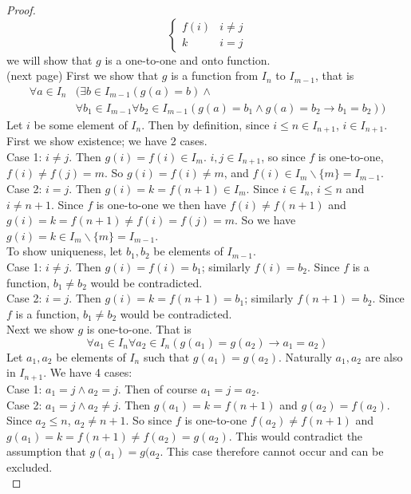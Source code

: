 \documentclass{report}
\theoremstyle{definition}
\begin{document}
\begin{proof}
\begin{equation*}
\begin{cases}
f(i)&i\neq j\\
k&i=j
\end{cases}
\end{equation*}
we will show that $g$ is a one-to-one and onto function.\\
(next page)\newpage
First we show that $g$ is a function from $I_n$ to $I_{m-1}$, that is
\begin{align*}
\forall a\in I_n&(\exists b\in I_{m-1}(g(a)=b)\land\\&\forall b_1\in I_{m-1}\forall b_2\in I_{m-1}(g(a)=b_1\land g(a)=b_2\to b_1=b_2))
\end{align*}
Let $i$ be some element of $I_n$. Then by definition, since $i\leq n\in I_{n+1}$, $i\in I_{n+1}$. First we show existence; we have 2
cases.\\
\indent Case 1: $i\neq j$. Then $g(i)=f(i)\in I_m$. $i,j\in I_{n+1}$, so since $f$ is one-to-one, $f(i)\neq f(j)=m$. 
So $g(i)=f(i)\neq m$, and $f(i)\in I_m\backslash\{m\}=I_{m-1}$.\\
\indent Case 2: $i=j$. Then $g(i)=k=f(n+1)\in I_m$. Since $i\in I_n$, $i\leq n$ and $i\neq n+1$. Since $f$ is one-to-one we then have 
$f(i)\neq f(n+1)$ and $g(i)=k=f(n+1)\neq f(i)=f(j)=m$. So we have $g(i)=k\in I_m\backslash\{m\}=I_{m-1}$.\\
\indent To show uniqueness, let $b_1,b_2$ be elements of $I_{m-1}$.\\
\indent Case 1: $i\neq j$. Then $g(i)=f(i)=b_1$; similarly $f(i)=b_2$. Since $f$ is a function, $b_1\neq b_2$ would be contradicted.\\
\indent Case 2: $i=j$. Then $g(i)=k=f(n+1)=b_1$; similarly $f(n+1)=b_2$. Since $f$ is a function, $b_1\neq b_2$ would be contradicted.\\
\indent Next we show $g$ is one-to-one. That is
\begin{equation*}
\forall a_1\in I_n\forall a_2\in I_n(g(a_1)=g(a_2)\to a_1=a_2)
\end{equation*}
Let $a_1,a_2$ be elements of $I_n$ such that
$g(a_1)=g(a_2)$. Naturally $a_1,a_2$ are also in $I_{n+1}$. We have 4 cases:\\
\indent Case 1: $a_1=j\land a_2=j$. Then of course $a_1=j=a_2$.\\
\indent Case 2: $a_1=j\land a_2\neq j$. Then $g(a_1)=k=f(n+1)$ and $g(a_2)=f(a_2)$. 
Since $a_2\leq n$, $a_2\neq n+1$. So since $f$ is one-to-one $f(a_2)\neq f(n+1)$ and $g(a_1)=k=f(n+1)\neq f(a_2)=g(a_2)$. This would 
contradict the assumption that $g(a_1)=g(a_2$. This case therefore cannot occur and can be excluded.\\

\end{proof}
\end{document}
